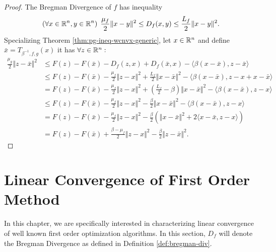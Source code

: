 \documentclass[12pt]{report}
\begin{document}
    \begin{proof}
        The Bregman Divergence of $f$ has inequality 
        \begin{align*}
            \left(\forall x \in \mathbb R^n, y \in \mathbb R^n\right)\; 
            \frac{\mu_f}{2}\Vert x - y\Vert^2 \le D_f(x, y) \le \frac{L_f}{2}\Vert x - y\Vert^2. 
        \end{align*}
        Specializing Theorem \ref{thm:pg-ineq-wcnvx-generic}, let $x \in \mathbb R^n$ and define $\bar x = T_{\beta^{-1}, f, g}(x)$ it has $\forall z \in \mathbb R^n:$
        \begin{align*}
            \frac{\mu_g}{2}\Vert z - \bar x \Vert^2 
            &\le 
            F(z) - F(\bar x) 
            - D_f(z, x) + D_f(\bar x, x) 
            - \langle \beta(x - \bar x), z - \bar x\rangle
            \\
            &\le 
            F(z) - F(\bar x) 
            - \frac{\mu_f}{2}\Vert z - x\Vert^2 
            + \frac{L_f}{2}\Vert x - \bar x\Vert^2
            - \langle \beta(x - \bar x), z - x + x - \bar x\rangle
            \\
            &= 
            F(z) - F(\bar x) 
            - \frac{\mu_f}{2}\Vert z - x\Vert^2 
            + \left(
                \frac{L_f}{2} - \beta
            \right)\Vert x - \bar x\Vert^2
            - \langle \beta(x - \bar x), z - x\rangle
            \\
            &\le 
            F(z) - F(\bar x) 
            - \frac{\mu_f}{2}\Vert z - x\Vert^2 
            - \frac{\beta}{2}\Vert x - \bar x\Vert^2
            - \langle \beta(x - \bar x), z - x\rangle
            \\
            &= 
            F(z) - F(\bar x) 
            - \frac{\mu_f}{2}\Vert z - x\Vert^2 
            - \frac{\beta}{2}
            \left(
                \Vert x - \bar x\Vert^2
                + 2\langle x - \bar x, z - x\rangle
            \right)
            \\
            &= 
            F(z) - F(\bar x) 
            + \frac{\beta - \mu_f}{2}\Vert z - x\Vert^2 
            - \frac{\beta}{2}\Vert z - \bar x\Vert^2. 
        \end{align*}
    \end{proof}
    
\chapter{Linear Convergence of First Order Method}
    In this chapter, we are specifically interested in characterizing linear convergence of well known first order optimization algorithms. 
    In this section, $D_f$ will denote the Bregman Divergence as defined in Definition \ref{def:bregman-div}. 
\end{document}
